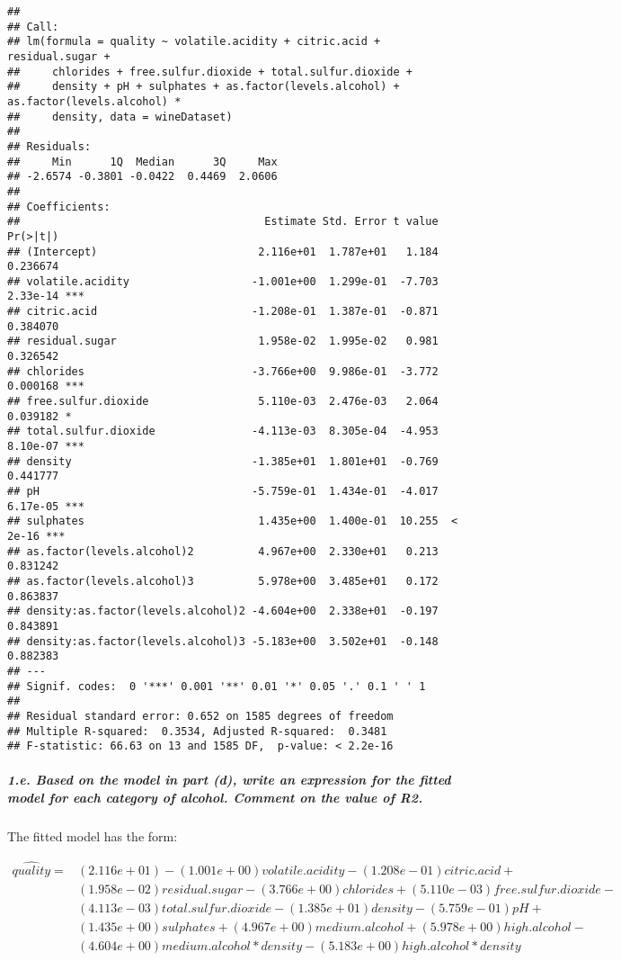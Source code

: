 \documentclass[
]{article}
\begin{document}
\begin{verbatim}
## 
## Call:
## lm(formula = quality ~ volatile.acidity + citric.acid + residual.sugar + 
##     chlorides + free.sulfur.dioxide + total.sulfur.dioxide + 
##     density + pH + sulphates + as.factor(levels.alcohol) + as.factor(levels.alcohol) * 
##     density, data = wineDataset)
## 
## Residuals:
##     Min      1Q  Median      3Q     Max 
## -2.6574 -0.3801 -0.0422  0.4469  2.0606 
## 
## Coefficients:
##                                      Estimate Std. Error t value Pr(>|t|)    
## (Intercept)                         2.116e+01  1.787e+01   1.184 0.236674    
## volatile.acidity                   -1.001e+00  1.299e-01  -7.703 2.33e-14 ***
## citric.acid                        -1.208e-01  1.387e-01  -0.871 0.384070    
## residual.sugar                      1.958e-02  1.995e-02   0.981 0.326542    
## chlorides                          -3.766e+00  9.986e-01  -3.772 0.000168 ***
## free.sulfur.dioxide                 5.110e-03  2.476e-03   2.064 0.039182 *  
## total.sulfur.dioxide               -4.113e-03  8.305e-04  -4.953 8.10e-07 ***
## density                            -1.385e+01  1.801e+01  -0.769 0.441777    
## pH                                 -5.759e-01  1.434e-01  -4.017 6.17e-05 ***
## sulphates                           1.435e+00  1.400e-01  10.255  < 2e-16 ***
## as.factor(levels.alcohol)2          4.967e+00  2.330e+01   0.213 0.831242    
## as.factor(levels.alcohol)3          5.978e+00  3.485e+01   0.172 0.863837    
## density:as.factor(levels.alcohol)2 -4.604e+00  2.338e+01  -0.197 0.843891    
## density:as.factor(levels.alcohol)3 -5.183e+00  3.502e+01  -0.148 0.882383    
## ---
## Signif. codes:  0 '***' 0.001 '**' 0.01 '*' 0.05 '.' 0.1 ' ' 1
## 
## Residual standard error: 0.652 on 1585 degrees of freedom
## Multiple R-squared:  0.3534, Adjusted R-squared:  0.3481 
## F-statistic: 66.63 on 13 and 1585 DF,  p-value: < 2.2e-16
\end{verbatim}

\hypertarget{e.-based-on-the-model-in-part-d-write-an-expression-for-the-fitted-model-for-each-category-of-alcohol.-comment-on-the-value-of-r2.}{%
\subparagraph{1.e. Based on the model in part (d), write an expression
for the fitted model for each category of alcohol. Comment on the value
of
R2.}\label{e.-based-on-the-model-in-part-d-write-an-expression-for-the-fitted-model-for-each-category-of-alcohol.-comment-on-the-value-of-r2.}}

The fitted model has the form:

\[
\begin{align}
\hat{quality} = &(2.116e+01) - (1.001e+00)volatile.acidity -(1.208e-01)citric.acid + \\
& (1.958e-02)residual.sugar - (3.766e+00)chlorides + (5.110e-03)free.sulfur.dioxide - \\ 
&(4.113e-03)total.sulfur.dioxide -(1.385e+01)density -(5.759e-01)pH + \\ 
& (1.435e+00)sulphates + (4.967e+00)medium.alcohol + (5.978e+00)high.alcohol - \\
&(4.604e+00)medium.alcohol*density - (5.183e+00)high.alcohol*density
\end{align}
\]
\end{document}
